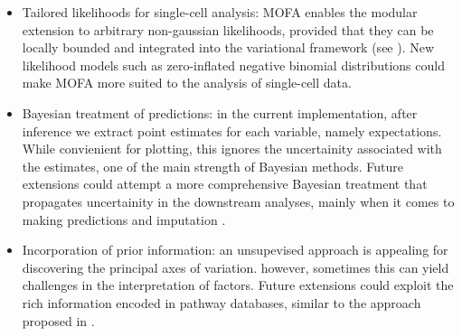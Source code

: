 \begin{itemize}
	\item Tailored likelihoods for single-cell analysis: MOFA enables the modular extension to arbitrary non-gaussian likelihoods, provided that they can be locally bounded and integrated into the variational framework (see ). New likelihood models such as zero-inflated negative binomial distributions \cite{Risso2018} could make MOFA more suited to the analysis of single-cell data.

	\item Bayesian treatment of predictions: in the current implementation, after inference we extract point estimates for each variable, namely expectations. While convienient for plotting, this ignores the uncertainity associated with the estimates, one of the main strength of Bayesian methods. Future extensions could attempt a more comprehensive Bayesian treatment that propagates uncertainity in the downstream analyses, mainly when it comes to making predictions and imputation \cite{Gelman2013}.

	\item Incorporation of prior information: an unsupevised approach is appealing for discovering the principal axes of variation. however, sometimes this can yield challenges in the interpretation of factors. Future extensions could exploit the rich information encoded in pathway databases, similar to the approach proposed in \cite{Buettner2017}.

\end{itemize}


